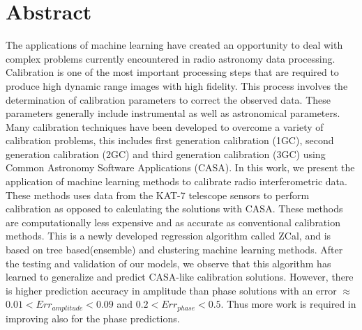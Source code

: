 \chapter*{Abstract} 


The applications of machine learning have created an opportunity to deal with complex problems currently encountered in radio astronomy data processing. Calibration is one of the most important processing steps that are required to produce high dynamic range images with high fidelity. This process involves the determination of calibration parameters to correct the observed data. These parameters generally include instrumental as well as astronomical parameters. Many calibration techniques have been developed to overcome a variety of calibration problems, this includes first generation calibration (1GC), second generation calibration (2GC) and third generation calibration (3GC) using Common Astronomy Software Applications (CASA). In    
this work, we present the application of machine learning methods to calibrate radio interferometric data. These methods uses data from the KAT-7 telescope sensors to perform calibration as opposed to calculating the solutions with CASA. These methods are computationally less expensive and as accurate as conventional calibration methods. This is a newly developed regression algorithm called ZCal, and is based on tree based(ensemble) and clustering machine learning methods. After the testing and validation of our models, we observe that this algorithm has learned to generalize and predict CASA-like calibration solutions. However, there is higher prediction accuracy in amplitude than phase solutions with an error $\approx$ $0.01<Err_{amplitude}<0.09$ and $0.2<Err_{phase}<0.5$. Thus more work is required in improving also for the phase predictions.   



\vfill
